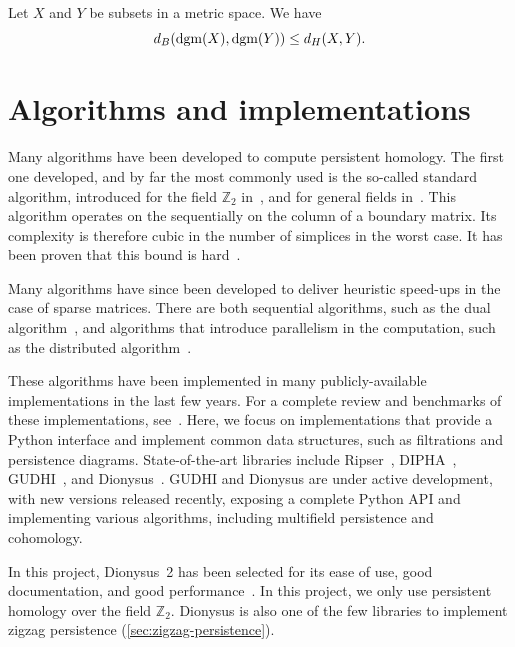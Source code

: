 \documentclass[a4paper,11pt,openany,extrafontsizes]{memoir}
\begin{document}
\begin{prop}
  Let $X$ and $Y$ be subsets in a metric space. We have
  \[ d_B(\operatorname{dgm}(X),\operatorname{dgm}(Y)) \leq d_H(X,Y). \]
\end{prop}

\section{Algorithms and implementations}%
\label{sec:algor-impl}

Many algorithms have been developed to compute persistent
homology. The first one developed, and by far the most commonly used
is the so-called standard algorithm, introduced for the field
$\mathbb{Z}_2$ in~\cite{edelsbrunner_topological_2000}, and for
general fields in~\cite{zomorodian_computing_2005}. This algorithm
operates on the sequentially on the column of a boundary matrix. Its
complexity is therefore cubic in the number of simplices in the worst
case. It has been proven that this bound is
hard~\cite{morozov_persistence_2005}.

Many algorithms have since been developed to deliver heuristic
speed-ups in the case of sparse matrices. There are both sequential
algorithms, such as the dual algorithm~\cite{de_silva_persistent_2011,
  de_silva_dualities_2011}, and algorithms that introduce parallelism
in the computation, such as the distributed
algorithm~\cite{mcgeoch_distributed_2014}.

These algorithms have been implemented in many publicly-available
implementations in the last few years. For a complete review and
benchmarks of these implementations,
see~\cite{otter_roadmap_2017}. Here, we focus on implementations that
provide a Python interface and implement common data structures, such
as filtrations and persistence diagrams. State-of-the-art libraries
include Ripser~\cite{bauer_ripser:_2018},
DIPHA~\cite{reininghaus_dipha_2018}, GUDHI~\cite{maria_gudhi_2014},
and Dionysus~\cite{morozov_dionysus:_2018}. GUDHI and Dionysus are
under active development, with new versions released recently,
exposing a complete Python API and implementing various algorithms,
including multifield persistence and cohomology.

In this project, Dionysus~2 has been selected for its ease of use,
good documentation, and good performance~\cite{otter_roadmap_2017}. In
this project, we only use persistent homology over the field
$\mathbb{Z}_2$. Dionysus is also one of the few libraries to implement
zigzag persistence (\autoref{sec:zigzag-persistence}).
\end{document}

